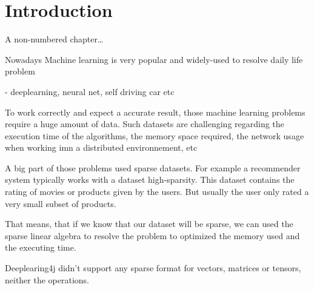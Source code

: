 \chapter*{Introduction}
A non-numbered chapter\dots

Nowadays Machine learning is very popular and widely-used to resolve daily life problem

- deeplearning, neural net, self driving car etc

To work correctly and expect a accurate result, those machine learning problems require a huge amount of data. Such datasets are challenging regarding the execution time of the algorithms, the memory space required, the network usage when working imn a distributed environnement, etc

A big part of those problems used sparse datasets. For example a recommender system typically works with a dataset high-sparsity. This dataset contains the rating of movies or products given by the users. But usually the user only rated a very small subset of products.

That means, that if we know that our dataset will be sparse, we can used the sparse linear algebra to resolve the problem to optimized the memory used and the executing time.

Deeplearing4j didn't support any sparse format for vectors, matrices or tensors, neither the operations.
